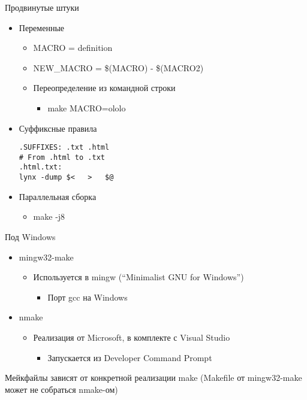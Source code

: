 \documentclass{../../slides-style}
\begin{document}
    \begin{frame}[fragile]{Продвинутые штуки}
        \begin{itemize}
            \item Переменные
            \begin{itemize}
                \item MACRO = definition
                \item NEW\_MACRO = \$(MACRO) - \$(MACRO2)
                \item Переопределение из командной строки
                \begin{itemize}
                    \item make MACRO=ololo
                \end{itemize}
            \end{itemize}
            \item Суффиксные правила
            \begin{footnotesize}
                \begin{verbatim}
.SUFFIXES: .txt .html
# From .html to .txt
.html.txt:
lynx -dump $<   >   $@
                \end{verbatim}
            \end{footnotesize}
            \item Параллельная сборка
            \begin{itemize}
                \item make -j8
            \end{itemize}
        \end{itemize}
    \end{frame}

    \begin{frame}{Под Windows}
        \begin{itemize}
            \item mingw32-make
            \begin{itemize}
                \item Используется в mingw (\enquote{Minimalist GNU for Windows})
                \begin{itemize}
                    \item Порт gcc на Windows
                \end{itemize}
            \end{itemize}
            \item nmake
            \begin{itemize}
                \item Реализация от Microsoft, в комплекте с Visual Studio
                \begin{itemize}
                    \item Запускается из Developer Command Prompt
                \end{itemize}
            \end{itemize}
        \end{itemize}
        Мейкфайлы зависят от конкретной реализации make (Makefile от mingw32-make может не собраться nmake-ом)
    \end{frame}
\end{document}
